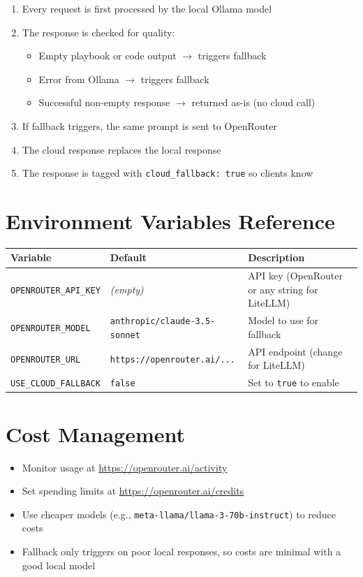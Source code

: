 \documentclass[11pt,a4paper]{article}
\begin{document}
\begin{enumerate}
  \item Every request is first processed by the local Ollama model
  \item The response is checked for quality:
    \begin{itemize}[nosep]
      \item Empty playbook or code output $\rightarrow$ triggers fallback
      \item Error from Ollama $\rightarrow$ triggers fallback
      \item Successful non-empty response $\rightarrow$ returned as-is (no cloud call)
    \end{itemize}
  \item If fallback triggers, the same prompt is sent to OpenRouter
  \item The cloud response replaces the local response
  \item The response is tagged with \texttt{cloud\_fallback: true} so clients know
\end{enumerate}

\section{Environment Variables Reference}

\begin{table}[h]
\centering
\begin{tabular}{lll}
\toprule
\textbf{Variable} & \textbf{Default} & \textbf{Description} \\
\midrule
\texttt{OPENROUTER\_API\_KEY} & \textit{(empty)} & API key (OpenRouter or any string for LiteLLM) \\
\texttt{OPENROUTER\_MODEL} & \texttt{anthropic/claude-3.5-sonnet} & Model to use for fallback \\
\texttt{OPENROUTER\_URL} & \texttt{https://openrouter.ai/...} & API endpoint (change for LiteLLM) \\
\texttt{USE\_CLOUD\_FALLBACK} & \texttt{false} & Set to \texttt{true} to enable \\
\bottomrule
\end{tabular}
\end{table}

\section{Cost Management}

\begin{itemize}
  \item Monitor usage at \url{https://openrouter.ai/activity}
  \item Set spending limits at \url{https://openrouter.ai/credits}
  \item Use cheaper models (e.g., \texttt{meta-llama/llama-3-70b-instruct}) to reduce costs
  \item Fallback only triggers on poor local responses, so costs are minimal with a good local model
\end{itemize}
\end{document}
